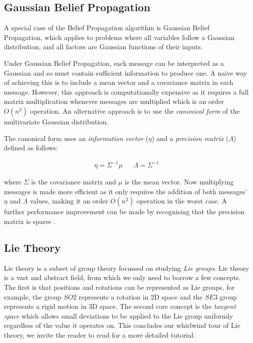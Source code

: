 \subsection{Gaussian Belief Propagation}
A special case of the Belief Propagation algorithm is Gaussian Belief Propagation, which applies to problems where all variables follow a Gaussian distribution, and all factors are Gaussian functions of their inputs.

Under Gaussian Belief Propagation, each message can be interpreted as a Gaussian and so must contain sufficient information to produce one. A naive way of achieving this is to include a mean vector and a covariance matrix in each message. However, this approach is computationally expensive as it requires a full matrix multiplication whenever messages are multiplied which is an order $O(n^3)$ operation. An alternative approach is to use the \textit{canonical form} of the multivariate Gaussian distribution.

The canonical form uses an \textit{information vector} ($\eta$) and a \textit{precision matrix} ($\Lambda$) defined as follows:

\begin{align*}
    \eta = \Sigma^{-1} \mu && \Lambda = \Sigma^{-1}
\end{align*}

where $\Sigma$ is the covariance matrix and $\mu$ is the mean vector. Now multiplying messages is made more efficient as it only requires the addition of both messages' $\eta$ and $\Lambda$ values, making it an order $O(n^2)$ operation in the worst case. A further performance improvement can be made by recognising that the precision matrix is sparse \cite{GaussianBP}.


\subsection{Lie Theory}
Lie theory is a subset of group theory focussed on studying \textit{Lie groups}. Lie theory is a vast and abstract field, from which we only need to borrow a few concepts. The first is that positions and rotations can be represented as Lie groups, for example, the group $SO2$ represents a rotation in 2D space and the $SE3$ group represents a rigid motion in 3D space. The second core concept is the \textit{tangent space} which allows small deviations to be applied to the Lie group uniformly regardless of the value it operates on. This concludes our whirlwind tour of Lie theory, we invite the reader to read \cite{MicroLieTheory} for a more detailed tutorial.

